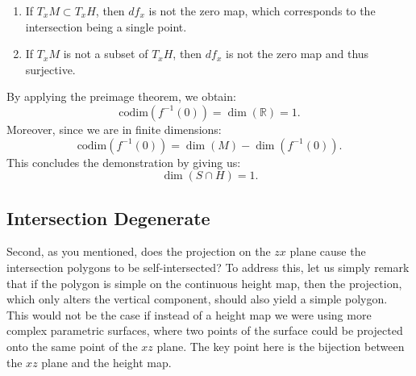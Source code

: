\documentclass{article}
\begin{document}
\begin{enumerate}
	\item If $T_x M \subset T_x H$, then $df_x$ is not the zero map, which corresponds to the intersection being a single point.
	\item If $T_x M$ is not a subset of $T_x H$, then $df_x$ is not the zero map and thus surjective.
\end{enumerate}

By applying the preimage theorem, we obtain:
\begin{equation}
	\text{codim}(f^{-1}(0)) = \dim(\mathbb{R}) = 1.
\end{equation}
Moreover, since we are in finite dimensions:
\begin{equation}
	\text{codim}(f^{-1}(0)) = \dim(M) - \dim(f^{-1}(0)).
\end{equation}
This concludes the demonstration by giving us:
\begin{equation}
	\dim(S \cap H) = 1.
\end{equation}

\subsection{Intersection Degenerate}

Second, as you mentioned, does the projection on the $zx$ plane cause the intersection polygons to be self-intersected? To address this, let us simply remark that if the polygon is simple on the continuous height map, then the projection, which only alters the vertical component, should also yield a simple polygon. This would not be the case if instead of a height map we were using more complex parametric surfaces, where two points of the surface could be projected onto the same point of the $xz$ plane. The key point here is the bijection between the $xz$ plane and the height map.
\end{document}
